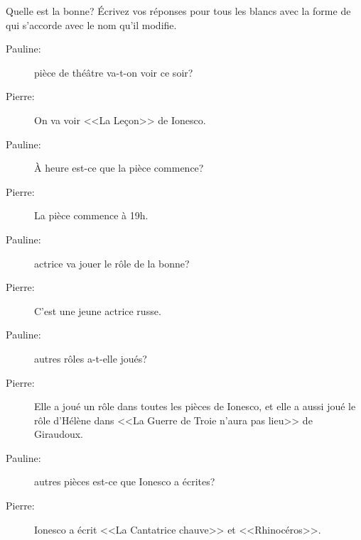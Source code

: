 \begin{frame}{Quelle est la bonne?}
  \small
  Écrivez vos réponses pour tous les blancs avec la forme de  qui s'accorde avec le nom qu'il modifie.
  \begin{description}
    \item[Pauline:] \underline{} pièce de théâtre va-t-on voir ce soir?
    \item[Pierre:] On va voir <<La Leçon>> de Ionesco.
    \item[Pauline:] À \underline{} heure est-ce que la pièce commence?
    \item[Pierre:] La pièce commence à 19h.
    \item[Pauline:] \underline{} actrice va jouer le rôle de la bonne?
    \item[Pierre:] C'est une jeune actrice russe.
    \item[Pauline:] \underline{} autres rôles a-t-elle joués?
    \item[Pierre:] Elle a joué un rôle dans toutes les pièces de Ionesco, et elle a aussi joué le rôle d'Hélène dans <<La Guerre de Troie n'aura pas lieu>> de Giraudoux.
    \item[Pauline:] \underline{} autres pièces est-ce que Ionesco a écrites?
    \item[Pierre:] Ionesco a écrit <<La Cantatrice chauve>> et <<Rhinocéros>>.
  \end{description}
\end{frame}
